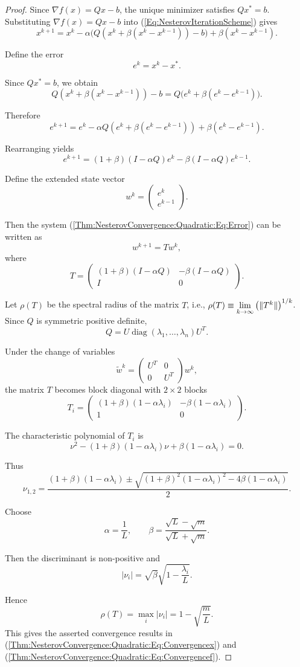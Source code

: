 \begin{proof}
Since $\nabla f(x) = Qx - b$, the unique minimizer satisfies $Qx^* = b$. Substituting $\nabla f(x)=Qx-b$ into (\ref{Eq:NesterovIterationScheme}) gives
\[
x^{k+1}
=
x^k
-
\alpha \Big(
Q(x^k + \beta(x^k - x^{k-1})) - b
\Big)
+
\beta(x^k - x^{k-1}).
\]

Define the error
\[
e^k = x^k - x^*.
\]

Since $Qx^*=b$, we obtain
\[
Q(x^k + \beta(x^k - x^{k-1})) - b
=
Q\big(
e^k + \beta(e^k - e^{k-1})
\big).
\]

Therefore
\[
e^{k+1}
=
e^k
-
\alpha Q(e^k + \beta(e^k - e^{k-1}))
+
\beta(e^k - e^{k-1}).
\]

Rearranging yields
\begin{equation}\label{Thm:NesterovConvergence:Quadratic:Eq:Error}
e^{k+1}
=
(1+\beta)(I-\alpha Q)e^k
-
\beta(I-\alpha Q)e^{k-1}.
\end{equation}

Define the extended state vector
\[
w^k
=
\begin{pmatrix}
e^k \\
e^{k-1}
\end{pmatrix}.
\]

Then the system (\ref{Thm:NesterovConvergence:Quadratic:Eq:Error}) can be written as
\[
w^{k+1} = T w^k,
\]
where
\[
T
=
\begin{pmatrix}
(1+\beta)(I-\alpha Q) & -\beta(I-\alpha Q) \\
I & 0
\end{pmatrix}.
\]

Let $\rho(T)$ be the spectral radius of the matrix $T$, i.e., $\rho(T)\equiv \lim\limits_{k\rightarrow \infty}\left(\|T^k\|\right)^{1/k}$.
Since $Q$ is symmetric positive definite,
\[
Q = U \operatorname{diag}(\lambda_1,\dots,\lambda_n) U^T.
\]

Under the change of variables
\[
\tilde w^k =
\begin{pmatrix}
U^T & 0 \\
0 & U^T
\end{pmatrix}
w^k,
\]
the matrix $T$ becomes block diagonal with $2\times 2$ blocks
\[
T_i
=
\begin{pmatrix}
(1+\beta)(1-\alpha\lambda_i)
&
-\beta(1-\alpha\lambda_i)
\\
1 & 0
\end{pmatrix}.
\]

The characteristic polynomial of $T_i$ is
\[
\nu^2
-
(1+\beta)(1-\alpha\lambda_i)\nu
+
\beta(1-\alpha\lambda_i)
=
0.
\]

Thus
\[
\nu_{1,2}
=
\frac{
(1+\beta)(1-\alpha\lambda_i)
\pm
\sqrt{
(1+\beta)^2(1-\alpha\lambda_i)^2
-
4\beta(1-\alpha\lambda_i)
}
}{2}.
\]

Choose
\[
\alpha=\frac1L,
\qquad
\beta
=
\frac{\sqrt L-\sqrt m}{\sqrt L+\sqrt m}.
\]

Then the discriminant is non-positive and
\[
|\nu_i|
=
\sqrt{\beta}
\sqrt{1-\frac{\lambda_i}{L}}.
\]

Hence
\[
\rho(T)
=
\max_i |\nu_i|
=
1-\sqrt{\frac{m}{L}}.
\]
This gives the asserted convergence results in (\ref{Thm:NesterovConvergence:Quadratic:Eq:Convergencex}) and (\ref{Thm:NesterovConvergence:Quadratic:Eq:Convergencef}).
\end{proof}

